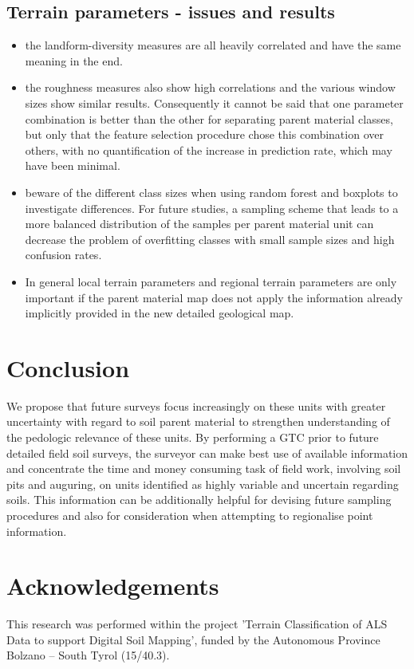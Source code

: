 \documentclass[preprint,12pt,authoryear]{elsarticle}
\begin{document}
\subsection{Terrain parameters - issues and results}
\begin{itemize}
\item the landform-diversity measures are all heavily correlated and have the same meaning in the end.
\item the roughness measures also show high correlations and the various window sizes show similar results. Consequently it cannot be said that one parameter combination is better than the other for separating parent material classes, but only that the feature selection procedure chose this combination over others, with no quantification of the increase in prediction rate, which may have been minimal.
\item beware of the different class sizes when using random forest and boxplots to investigate differences. For future studies, a sampling scheme that leads to a more balanced distribution of the samples per parent material unit can decrease the problem of overfitting classes with small sample sizes and high confusion rates.
\item In general local terrain parameters and regional terrain parameters are only important if the parent material map does not apply the information already implicitly provided in the new detailed geological map.
\end{itemize}

\section{Conclusion}
We propose that future surveys focus increasingly on these units with greater uncertainty with regard to soil parent material to strengthen understanding of the pedologic relevance of these units. By performing a GTC prior to future detailed field soil surveys, the surveyor can make best use of available information and concentrate the time and money consuming task of field work, involving soil pits and auguring, on units identified as highly variable and uncertain regarding soils. This information can be additionally helpful for devising future sampling procedures and also for consideration when attempting to regionalise point information.

\section*{Acknowledgements} This research was performed within the project 'Terrain Classification of ALS Data to support Digital Soil Mapping', funded by the Autonomous Province Bolzano -- South Tyrol (15/40.3).
\end{document}
